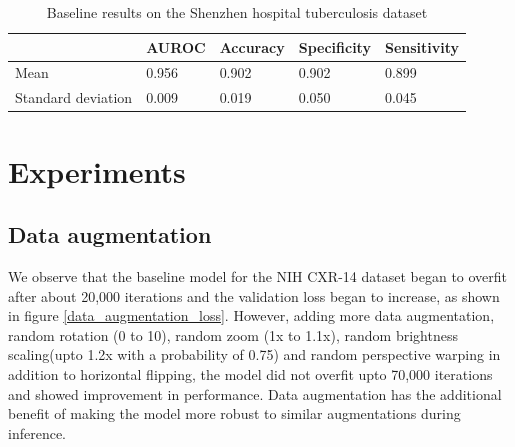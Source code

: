 \documentclass[12pt,oneside,a4paper]{report}
\begin{document}
\begin{table}[]
  \centering
  \begin{tabular}{@{}lllll@{}}
    \toprule
    & \textbf{AUROC} & \textbf{Accuracy} & \textbf{Specificity} & \textbf{Sensitivity} \\ \midrule
    Mean               & 0.956          & 0.902             & 0.902                & 0.899                \\ \midrule
    Standard deviation & 0.009          & 0.019             & 0.050                & 0.045                \\ \bottomrule
  \end{tabular}
  \caption{Baseline results on the Shenzhen hospital tuberculosis dataset}
  \label{tab:baseline_shenzhen}
\end{table}

\chapter{Experiments\label{exp}}
\section{Data augmentation}
We observe that the baseline model for the NIH CXR-14 dataset began to overfit
after about 20,000 iterations and the validation loss began to increase, as
shown in figure \ref{data_augmentation_loss}. However, adding more data
augmentation, random rotation (0\textdegree{} to 10\textdegree{}), random zoom
(1x to 1.1x), random brightness scaling(upto 1.2x with a probability of 0.75)
and random perspective warping in addition to horizontal flipping, the model did
not overfit upto 70,000 iterations and showed improvement in performance. Data
augmentation has the additional benefit of making the model more robust to
similar augmentations
during inference.\\
\end{document}
